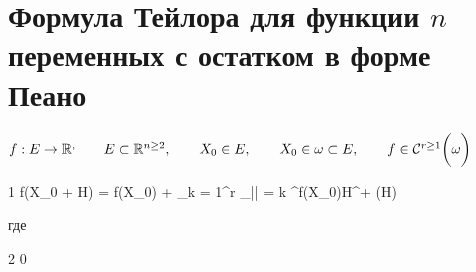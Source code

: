 \section{Формула Тейлора для функции \texorpdfstring{$ n $}n переменных с остатком в форме Пеано}

\begin{theorem}
	$ f : E \to \R^, \qquad E \sub \R^{n \ge 2}, \qquad X_0 \in E, \qquad X_0 \in \omega \sub E, \qquad f \in \Cont[r \ge 1]{\omega} $
	\begin{equ}1
		\implies f(X_0 + H) = f(X_0) + \sum_{k = 1}^r \sum_{|\alpha| = k}  \partial^\alpha f(X_0)H^\alpha + \rho(H)
	\end{equ}
	где
	\begin{equ}2
		 \underarr{H \to \On} 0
	\end{equ}
\end{theorem}

